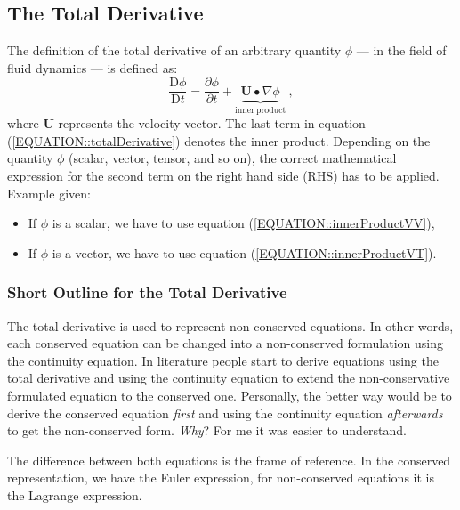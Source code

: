 \subsection{The Total Derivative}
%
%
      The definition of the total derivative of an arbitrary quantity $\phi$
      --- in the field of fluid dynamics --- is defined as:
%
%
\begin{equation}
    \frac{\mathrm{D}\phi}{\mathrm{D}t} = \frac{\partial \phi}{\partial t} + \underbrace{\textbf{U}\bullet \nabla \phi}_{\mathrm{inner~product}} ~,
    \label{EQUATION::totalDerivative}
\end{equation}
%
%
	where $\textbf{U}$ represents the velocity vector. The last term in
    equation (\ref{EQUATION::totalDerivative}) denotes the inner product.
    Depending on the quantity $\phi$ (scalar, vector, tensor, and so on), the
    correct mathematical expression for the second term on the right hand side
    (RHS) has to be applied. Example given:
%
%
\begin{itemize}
    \item If $\phi$ is a scalar, we have to use equation (\ref{EQUATION::innerProductVV}),
    \item If $\phi$ is a vector, we have to use equation (\ref{EQUATION::innerProductVT}).
\end{itemize}
%
%
%
%
\subsubsection{Short Outline for the Total Derivative}
%
%
	The total derivative is used to represent non-conserved equations. In other
    words, each conserved equation can be changed into a non-conserved
    formulation using the continuity equation. In literature people start to
    derive equations using the total derivative and using the continuity
    equation to extend the non-conservative formulated equation to the conserved
    one. Personally, the better way would be to derive  the conserved equation
    \textit{first} and  using the continuity equation \textit{afterwards} to get
    the non-conserved form. \textit{Why}? For me it was easier to understand.


	The difference between both equations is the frame of reference. In the
    conserved representation, we have the Euler expression, for non-conserved
    equations it is the Lagrange expression.


